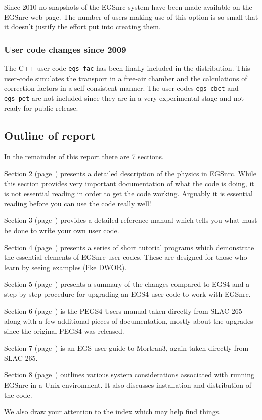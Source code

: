 Since 2010 no snapshots of the EGSnrc system have been made
available on the EGSnrc web page. The number of users making use
of this option is so small that it doesn't justify the effort put
into creating them.

\subsubsection{User code changes since 2009}

The C++ user-code {\tt egs\_fac} has been finally included in the
distribution. This user-code simulates the transport in a
free-air chamber and the calculations of correction factors
in a self-consistent manner. The user-codes {\tt egs\_cbct}
and {\tt egs\_pet} are not included since they are in a very
experimental stage and not ready for public release.

\subsection{Outline of report}

In the remainder of this report there are 7 sections.

Section 2 (page~\pageref{section_2}) presents a detailed description
of the physics in EGSnrc. While this section provides very important
documentation of what the code is doing, it is not essential reading in
order to get the code working.  Arguably it is essential reading before
you can use the code really well!

Section 3 (page~\pageref{ERM}) provides a detailed reference manual
which tells you what must be done to write your own user code.

Section 4 (page~\pageref{tutorials}) presents a series of short tutorial
programs which demonstrate the essential elements of EGSnrc user codes.
These are designed for those who learn by seeing examples (like DWOR).

Section 5 (page~\pageref{changes}) presents a summary of the changes
compared to EGS4 and a step by step procedure for upgrading an EGS4 user
code to work with EGSnrc.

Section 6 (page~\pageref{pegs4}) is the PEGS4 Users manual taken directly
from SLAC-265 along with a few additional pieces of documentation,
mostly about the upgrades since the original PEGS4 was released.

Section 7 (page~\pageref{UGM3}) is an EGS user guide to Mortran3, again
taken directly from SLAC-265.

Section 8 (page~\pageref{sys_consid}) outlines various system
considerations associated with running EGSnrc in a Unix environment. It
also discusses installation and distribution of the code.

We also draw your attention to the index which may help  find things.
